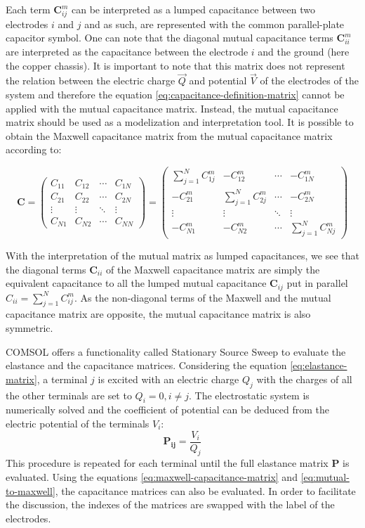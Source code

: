 Each term $\bm{C}_{ij}^m$ can be interpreted as a lumped capacitance between two electrodes $i$ and $j$ and as such, are represented with the common parallel-plate capacitor symbol. One can note that the diagonal mutual capacitance terms $\bm{C}_{ii}^m$ are interpreted as the capacitance between the electrode $i$ and the ground (here the copper chassis). It is important to note that this matrix does not represent the relation between the electric charge $\vec{Q}$ and potential $\vec{V}$ of the electrodes of the system and therefore the equation \ref{eq:capacitance-definition-matrix} cannot be applied with the mutual capacitance matrix. Instead, the mutual capacitance matrix should be used as a modelization and interpretation tool. It is possible to obtain the Maxwell capacitance matrix from the mutual capacitance matrix according to:

\begin{equation} 
\label{eq:mutual-to-maxwell}
\bm{C} = 
\begin{pmatrix}
C_{11} & C_{12} & \cdots & C_{1N} \\ 
C_{21} & C_{22} & \cdots & C_{2N} \\ 
\vdots & \vdots & \ddots & \vdots \\ 
C_{N1} & C_{N2} & \cdots & C_{NN}
\end{pmatrix}
 = 
\begin{pmatrix}
\sum_{j=1}^N C_{1j}^m & -C_{12}^m & \cdots & -C_{1N}^m \\[0.3em]
-C_{21}^m & \sum_{j=1}^N C_{2j}^m & \cdots & -C_{2N}^m \\[0.3em]
\vdots & \vdots & \ddots & \vdots \\[0.3em] 
-C_{N1}^m & -C_{N2}^m & \cdots & \sum_{j=1}^N C_{Nj}^m
\end{pmatrix}
\end{equation}

With the interpretation of the mutual matrix as lumped capacitances, we see that the diagonal terms $\bm{C}_{ii}$ of the Maxwell capacitance matrix are simply the equivalent capacitance to all the lumped mutual capacitance $\bm{C}_{ij}$ put in parallel $C_{ii} = \sum_{j=1}^N C_{ij}^m$. As the non-diagonal terms of the Maxwell and the mutual capacitance matrix are opposite, the mutual capacitance matrix is also symmetric.

COMSOL offers a functionality called Stationary Source Sweep to evaluate the elastance and the capacitance matrices. Considering the equation \ref{eq:elastance-matrix}, a terminal $j$ is excited with an electric charge $Q_j$ with the charges of all the other terminals are set to $Q_i=0 , i\neq j$. The electrostatic system is numerically solved and the coefficient of potential can be deduced from the electric potential of the terminals $V_i$:
\begin{equation}
\bm{P_{ij}} = \frac{V_i}{Q_j}
\end{equation}
This procedure is repeated for each terminal until the full elastance matrix $\bm{P}$ is evaluated. Using the equations \ref{eq:maxwell-capacitance-matrix} and \ref{eq:mutual-to-maxwell}, the capacitance matrices can also be evaluated. In order to facilitate the discussion, the indexes of the matrices are swapped with the label of the electrodes. 


